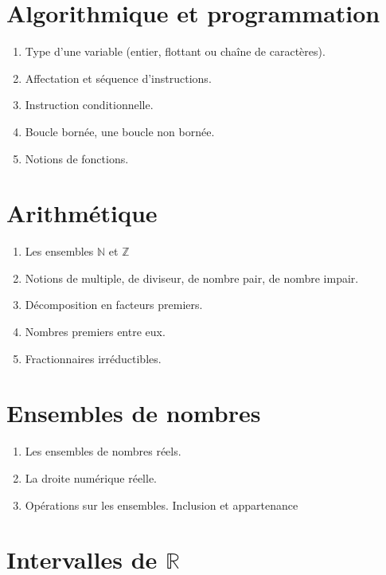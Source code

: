\documentclass[10pt,a4paper]{article}
\begin{document}



\section{Algorithmique et programmation}


\begin{enumerate} 
\item Type d'une variable (entier, flottant ou chaîne de caractères).
\item Affectation et séquence d'instructions.
\item Instruction conditionnelle.
\item Boucle bornée, une boucle non bornée.
\item Notions de fonctions.
\end{enumerate}

\section{Arithmétique}



\begin{enumerate}
\item Les ensembles $\mathbb{N}$ et $\mathbb{Z}$
\item Notions de multiple, de diviseur, de nombre pair, de nombre impair.
\item Décomposition en facteurs premiers.
\item Nombres premiers entre eux.
\item Fractionnaires irréductibles.
\end{enumerate}
 

\section{Ensembles de nombres}



\begin{enumerate}
\item Les ensembles de nombres réels.
\item La droite numérique réelle.
\item Opérations sur les ensembles. Inclusion et appartenance
\end{enumerate}


\section{Intervalles de $\mathbb{R}$}
\end{document}

